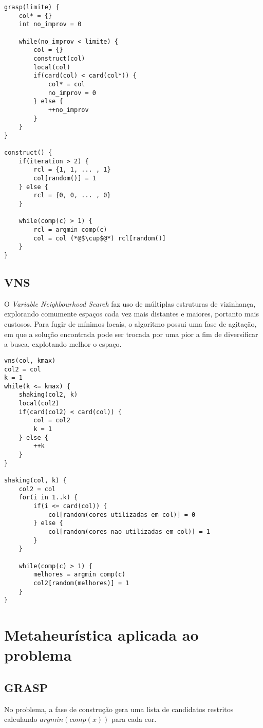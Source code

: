 \documentclass[12pt, a4paper]{article}
\begin{document}
\begin{lstlisting}[caption=Pseudocódigo para GRASP, basicstyle=\ttfamily\scriptsize]
grasp(limite) {
    col* = {}
    int no_improv = 0

    while(no_improv < limite) {
        col = {}
        construct(col)
        local(col)
        if(card(col) < card(col*)) {
            col* = col
            no_improv = 0
        } else {
            ++no_improv
        }
    }
}

construct() {
    if(iteration > 2) {
        rcl = {1, 1, ... , 1}
        col[random()] = 1
    } else {
        rcl = {0, 0, ... , 0}
    }

    while(comp(c) > 1) {
        rcl = argmin comp(c)
        col = col (*@$\cup$@*) rcl[random()]
    }
}
\end{lstlisting}

\subsection{VNS}
O \emph{Variable Neighbourhood Search} faz uso de múltiplas estruturas de
vizinhança, explorando comumente espaços cada vez mais distantes e maiores,
portanto mais custosos. Para fugir de mínimos locais, o algoritmo possui uma fase
de agitação, em que a solução encontrada pode ser trocada por uma pior a fim de
diversificar a busca, explotando melhor o espaço.

\begin{lstlisting}[caption=Pseudocódigo para VNS, basicstyle=\ttfamily\scriptsize]
vns(col, kmax)
col2 = col
k = 1
while(k <= kmax) {
    shaking(col2, k)
    local(col2)
    if(card(col2) < card(col)) {
        col = col2
        k = 1
    } else {
        ++k
    }
}

shaking(col, k) {
    col2 = col
    for(i in 1..k) {
        if(i <= card(col)) {
            col[random(cores utilizadas em col)] = 0
        } else {
            col[random(cores nao utilizadas em col)] = 1
        }
    }

    while(comp(c) > 1) {
        melhores = argmin comp(c)
        col2[random(melhores)] = 1
    }
}
\end{lstlisting}


\section{Metaheurística aplicada ao problema}
\subsection{GRASP}
No problema, a fase de construção gera uma lista de candidatos restritos
calculando $ argmin(comp(x)) $ para cada cor.
\end{document}

